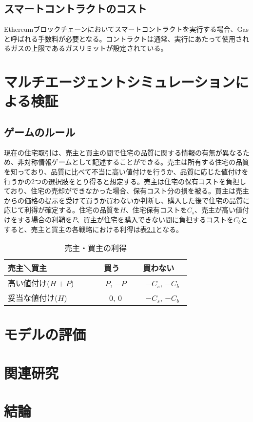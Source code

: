\documentclass[a4paper,fontsize=11pt,report,notitlepage,line_length=38zw,number_of_lines=40]{jlreq}
\begin{document}
\section{スマートコントラクトのコスト}
Ethereumブロックチェーンにおいてスマートコントラクトを実行する場合、Gasと呼ばれる手数料が必要となる。コントラクトは通常、実行にあたって使用されるガスの上限であるガスリミットが設定されている。

\chapter{マルチエージェントシミュレーションによる検証}
\section{ゲームのルール}
現在の住宅取引は、売主と買主の間で住宅の品質に関する情報の有無が異なるため、非対称情報ゲームとして記述することができる。売主は所有する住宅の品質を知っており、品質に比べて不当に高い値付けを行うか、品質に応じた値付けを行うかの2つの選択肢をとり得ると想定する。売主は住宅の保有コストを負担しており、住宅の売却ができなかった場合、保有コスト分の損を被る。買主は売主からの価格の提示を受けて買うか買わないか判断し、購入した後で住宅の品質に応じて利得が確定する。住宅の品質を$H$、住宅保有コストを$C_s$、売主が高い値付けをする場合の利鞘を$P$、買主が住宅を購入できない間に負担するコストを$C_b$とすると、売主と買主の各戦略における利得は表\ref{ritoku}となる。

\begin{table}
\begin{center}
\caption{売主・買主の利得}
\label{ritoku}
\begin{tabular}{l|cc}
売主＼買主 & 買う & 買わない \\ \hline
高い値付け($H+P$)　　 & 　$P$,  $-P$ & 　$-C_s$,  $-C_b$　 \\
妥当な値付け($H$)　　 & 　0, 0 & 　$-C_s$,  $-C_b$　
\end{tabular}
\end{center}
\end{table}%



\chapter{モデルの評価}
\chapter{関連研究}
\chapter{結論}



\end{document}
